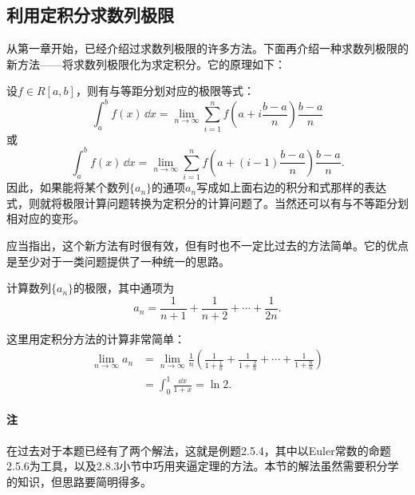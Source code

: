 \subsection{利用定积分求数列极限}

从第一章开始，已经介绍过求数列极限的许多方法。下面再介绍一种求数列极限的新方法——将求数列极限化为求定积分。它的原理如下：

设$f\in R[a,b]$，则有与等距分划对应的极限等式：
\[
  \int_a^bf(x)\,\dd x
  =\lim_{n\to\infty}\sum_{i=1}^nf\left(a+i\frac{b-a}{n}\right)\frac{b-a}{n}
\]
或
\[
  \int_a^bf(x)\,\dd x
  =\lim_{n\to\infty}\sum_{i=1}^nf\left(a+(i-1)\frac{b-a}{n}\right)\frac{b-a}{n}.
\]
因此，如果能将某个数列$\{a_n\}$的通项$a_n$写成如上面右边的积分和式那样的表达式，则就将极限计算问题转换为定积分的计算问题了。当然还可以有与不等距分划相对应的变形。

应当指出，这个新方法有时很有效，但有时也不一定比过去的方法简单。它的优点是至少对于一类问题提供了一种统一的思路。

\begin{xexample}[11.4.1]
计算数列$\{a_n\}$的极限，其中通项为
\[
  a_n=\frac1{n+1}+\frac1{n+2}+\cdots+\frac1{2n}.
\]
\end{xexample}
\begin{xsolution}
这里用定积分方法的计算非常简单：
\begin{align*}
\lim_{n\to\infty}a_n
&=\lim_{n\to\infty}\frac1n\left(
\frac1{1+\frac1n}+\frac1{1+\frac2n}+\cdots+\frac1{1+\frac nn}
\right)\\
&=\int_0^1\frac{\dd x}{1+x}=\ln2.
\end{align*}
\end{xsolution}

\paragraph{注} 在过去对于本题已经有了两个解法，这就是例题2.5.4，其中以Euler常数的命题2.5.6为工具，以及2.8.3小节中巧用夹逼定理的方法。本节的解法虽然需要积分学的知识，但思路要简明得多。

